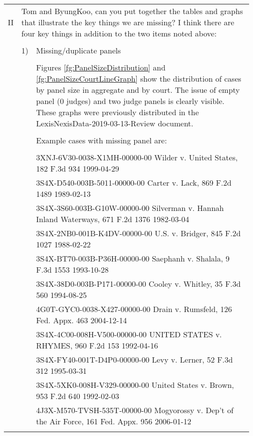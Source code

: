\documentclass[10pt, letterpaper]{article}
\begin{document}
\begin{spacing}{1.0}
\begin{longtable}{p{0.25in}p{0.25in}p{6in}}
    II & \multicolumn{2}{p{6.25in}}{Tom and ByungKoo, can you put together the tables and graphs that illustrate the key things we are missing? I think there are four key things in addition to the two items noted above:}\\\\
    
    & 1) & Missing/duplicate panels\\\\
    
    & & \color{red}Figures \ref{fg:PanelSizeDistribution} and \ref{fg:PanelSizeCourtLineGraph} show the distribution of cases by panel size in aggregate and by court.  The issue of empty panel (0 judges) and two judge panels is clearly visible.  These graphs were previously distributed in the LexisNexisData-2019-03-13-Review document.\\\\
    & & \color{red}Example cases with missing panel are:\\\\
    & & \small\color{red}3XNJ-6V30-0038-X1MH-00000-00	Wilder v. United States, 182 F.3d 934	1999-04-29\\
    & & \small\color{red}3S4X-D540-003B-5011-00000-00	Carter v. Lack, 869 F.2d 1489	1989-02-13\\
    & & \small\color{red}3S4X-3S60-003B-G10W-00000-00	Silverman v. Hannah Inland Waterways, 671 F.2d 1376	1982-03-04\\
    & & \small\color{red}3S4X-2NB0-001B-K4DV-00000-00	U.S. v. Bridger, 845 F.2d 1027	1988-02-22\\
    & & \small\color{red}3S4X-BT70-003B-P36H-00000-00	Saephanh v. Shalala, 9 F.3d 1553	1993-10-28\\
    & & \small\color{red}3S4X-38D0-003B-P171-00000-00	Cooley v. Whitley, 35 F.3d 560	1994-08-25\\
    & & \small\color{red}4G0T-GYC0-0038-X427-00000-00	Drain v. Rumsfeld, 126 Fed. Appx. 463	2004-12-14\\
    & & \small\color{red}3S4X-4C00-008H-V500-00000-00	UNITED STATES v. RHYMES, 960 F.2d 153	1992-04-16\\
    & & \small\color{red}3S4X-FY40-001T-D4P0-00000-00	Levy v. Lerner, 52 F.3d 312	1995-03-31\\
    & & \small\color{red}3S4X-5XK0-008H-V329-00000-00	United States v. Brown, 953 F.2d 640	1992-02-03\\
    & & \small\color{red}4J3X-M570-TVSH-535T-00000-00	Mogyorossy v. Dep't of the Air Force, 161 Fed. Appx. 956 2006-01-12\\\\
    

\end{longtable}
\end{spacing}
\end{document}
